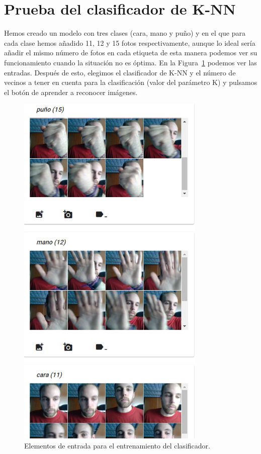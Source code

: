 \documentclass[a4paper, 12pt]{book}
\begin{document}
\section{Prueba del clasificador de K-NN} 
\label{sec:pruebaknn}

Hemos creado un modelo con tres clases (cara, mano y puño) y en el que para cada clase hemos añadido 11, 12 y 15 fotos respectivamente, aunque lo ideal sería añadir el mismo número de fotos en cada etiqueta de esta manera podemos ver su funcionamiento cuando la situación no es óptima. En la Figura~\ref{fig:fotosentrada} podemos ver las entradas. Después de esto, elegimos el clasificador de K-NN y el número de vecinos a tener en cuenta para la clasificación (valor del parámetro K) y pulsamos el botón de aprender a reconocer imágenes.

\begin{figure}
	\centering
	\includegraphics[width=9cm, keepaspectratio]{img/fotosentrada}
	\caption{Elementos de entrada para el entrenamiento del clasificador.}			
	\label{fig:fotosentrada}
\end{figure}
\end{document}
